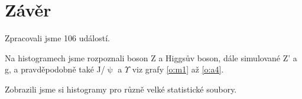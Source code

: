 \section*{Závěr}
Zpracovali jsme 106 událostí.

Na histogramech jsme rozpoznali boson Z a Higgsův boson, dále simulované Z' a g, a pravděpodobně také J/$\uppsi$ a $\Upsilon$ viz grafy \ref{o:m1} až \ref{o:a4}.

Zobrazili jsme si histogramy pro různě velké statistické soubory. 